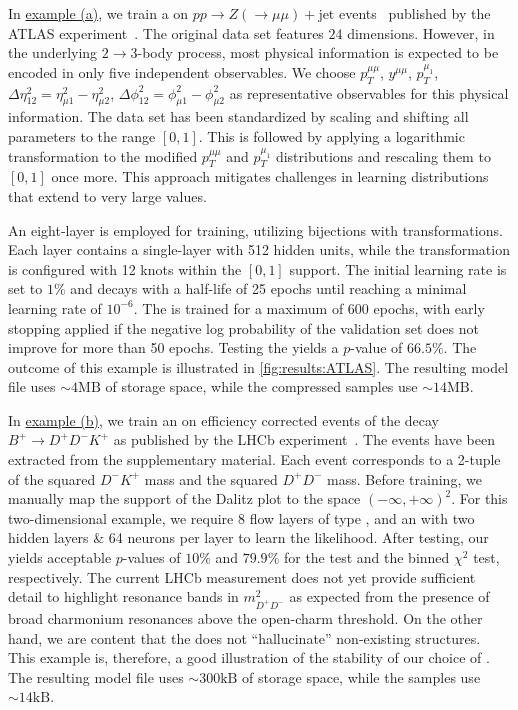 \documentclass[aps,nofootinbib,superscriptaddress,reprint,preprintnumbers]{revtex4-1}
\newcommand{\pvalue}{$p$-value\xspace}
\newcommand{\pvalues}{$p$-values\xspace}
\begin{document}
In \hyperref[fig:results:ATLAS]{example (a)}, we train a \LM on $pp \to Z(\to \mu\mu) + \text{jet}$ events~\cite{atlas_collaboration_2024_11507450} published by the ATLAS experiment~\cite{ATLAS:2024xxl}.
The original data set features $24$ dimensions. However, in the underlying $2\to 3$-body process,
most physical information is expected to be encoded in only five independent observables.
We choose $p_T^{\mu\mu}$, $y^{\mu\mu}$, $p_T^{\mu_1}$, $\Delta \eta_{12}^2=\eta_{\mu1}^2 - \eta_{\mu2}^2$, $\Delta \phi_{12}^2=\phi_{\mu1}^2 - \phi_{\mu2}^2$ as representative observables for this physical information.
The data set has been standardized by scaling and shifting all parameters to the range $[0,1]$.
This is followed by applying a logarithmic transformation to the modified $p_T^{\mu\mu}$ and $p_T^{\mu_1}$ distributions and rescaling them to $[0,1]$ once more.
This approach mitigates challenges in learning distributions that extend to very large values.

An eight-layer \NF is employed for training, utilizing \MAF bijections with \RQS transformations.
Each \MAF layer contains a single-layer \MLP with 512 hidden units, while the \RQS transformation is
configured with 12 knots within the $[0,1]$ support.
The initial learning rate is set to $1\%$ and decays with a half-life of 25 epochs until reaching a minimal learning rate of $10^{-6}$. 
The \NF is trained for a maximum of 600 epochs, with early stopping applied if the negative log probability of the validation set does not improve for more than 50 epochs. Testing the \LM yields a \KS \pvalue of $66.5\%$.
The outcome of this example is illustrated in \cref{fig:results:ATLAS}.
The resulting model file uses $\sim 4\text{MB}$ of storage space, while the compressed samples use $\sim 14\text{MB}$.

In \hyperref[fig:results:LHCb]{example (b)}, we train an \LM on efficiency corrected events of the decay $B^+\to D^+ D^- K^+$
as published by the LHCb experiment~\cite{LHCb:2020pxc}.
The events have been extracted from the supplementary material. Each event corresponds to a 2-tuple of the squared $D^- K^+$ mass and the squared $D^+D^-$ mass.
Before training, we manually map the support of the Dalitz plot to the space $(-\infty,+\infty)^2$.
For this two-dimensional example, we require 8 flow layers of type \RQS,
and an \MLP with two hidden layers \& 64 neurons per layer to learn the likelihood.
After testing, our \LM yields acceptable \pvalues of $10\%$ and $79.9\%$ for the \KS test and the binned $\chi^2$ test, respectively.
The current LHCb measurement does not yet
provide sufficient detail to highlight resonance bands in $m_{D^+D^-}^2$ as expected from the presence of
broad charmonium resonances above the open-charm threshold. On the other hand, we are content that the
\LM does not ``hallucinate'' non-existing structures.
This example is, therefore, a good illustration of the stability of our choice of \LM.
The resulting model file uses $\sim 300\text{kB}$ of storage space, while the samples use $\sim 14\text{kB}$.
\end{document}
